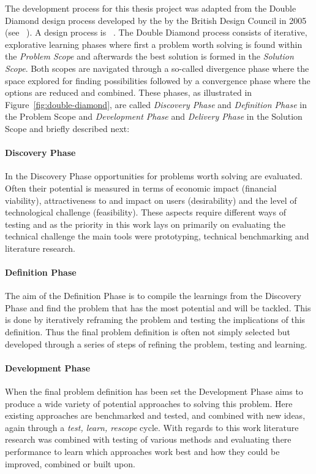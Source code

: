 The development process for this thesis project was adapted from the Double Diamond design process developed by the by the British Design Council in 2005 (see ~\cite{Council:2007aa}). A design process is ~\cite{Best:2006aa}.
The Double Diamond process consists of iterative, explorative learning phases where first a problem worth solving is found within the \emph{Problem Scope} and afterwards the best solution is formed in the \emph{Solution Scope}. Both scopes are navigated through a so-called divergence phase where the space explored for finding possibilities followed by a convergence phase where the options are reduced and combined. These phases, as illustrated in Figure~\ref{fig:double-diamond}, are called \emph{Discovery Phase} and \emph{Definition Phase} in the Problem Scope and \emph{Development Phase} and \emph{Delivery Phase} in the Solution Scope and briefly described next:

\paragraph{Discovery Phase}
\label{par:Discovery Phase}
In the Discovery Phase opportunities for problems worth solving are evaluated. Often their potential is measured in terms of economic impact (financial viability), attractiveness to and impact on users (desirability) and the level of technological challenge (feasibility).
These aspects require different ways of testing and as the priority in this work lays on primarily on evaluating the technical challenge the main tools were prototyping, technical benchmarking and literature research.

\paragraph{Definition Phase}
\label{par:Definition Phase}
The aim of the Definition Phase is to compile the learnings from the Discovery Phase and find the problem that has the most potential and will be tackled. This is done by iteratively reframing the problem and testing the implications of this definition.
Thus the final problem definition is often not simply selected but developed through a series of steps of refining the problem, testing and learning.

\paragraph{Development Phase}
\label{par:Development Phase}
When the final problem definition has been set the Development Phase aims to produce a wide variety of potential approaches to solving this problem. Here existing approaches are benchmarked and tested, and combined with new ideas, again through a \emph{test, learn, rescope} cycle.
With regards to this work literature research was combined with testing of various methods and evaluating there performance to learn which approaches work best and how they could be improved, combined or built upon.

